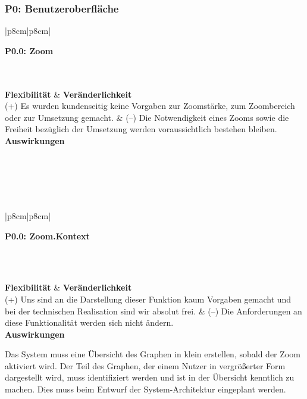 \documentclass[enabledeprecatedfontcommands,fontsize=11pt,paper=a4,twoside]{scrartcl}
\newcounter{one}
\newcounter{two}[one]
\newcommand{\tone}{0\theone}
\newcommand{\one}{\stepcounter{one}0\theone}
\newcommand{\two}{\stepcounter{two}0\thetwo}
\newcommand\s{\rule{0pt}{4ex}}
\begin{document}
\newpage
\subsubsection*{\hypertarget{dd}{P\one}: Benutzeroberfläche}
\begin{tabular} {|p{8cm}|p{8cm}|}
	\hline
	 {\parbox{16cm}{\textbf{\hypertarget{ee}{P\tone.\two}: Zoom}} }\\ \hline\hline
	\\ \hline
	\textbf{Flexibilität}  & \textbf{Veränderlichkeit} \\
	(+) Es wurden kundenseitig keine Vorgaben zur Zoomstärke, zum Zoombereich oder zur Umsetzung gemacht. &
	(--) Die Notwendigkeit eines Zooms sowie die Freiheit bezüglich der Umsetzung werden voraussichtlich bestehen bleiben. \\ \hline
	 {\textbf{Auswirkungen}} \\
	\\ \hline
\end{tabular}
\\ \\ \\
\begin{tabular} {|p{8cm}|p{8cm}|}
	\hline
	 {\parbox{16cm}{\textbf{\hypertarget{ff}{P\tone.\two}: Zoom.Kontext}} }\\ \hline\hline
	 \s\\ [1ex] \hline
	\textbf{Flexibilität}  & \textbf{Veränderlichkeit} \\
	(+) Uns sind an die Darstellung dieser Funktion kaum Vorgaben gemacht und bei der technischen Realisation sind wir absolut frei. &
	(--) Die Anforderungen an diese Funktionalität werden sich nicht ändern. \\ \hline
	 {\textbf{Auswirkungen}} \\
	 {\parbox{16cm}{Das System muss eine Übersicht des Graphen in klein erstellen, sobald der Zoom aktiviert wird. Der Teil des Graphen, der einem Nutzer in vergrößerter Form dargestellt wird, muss identifiziert werden und ist in der Übersicht kenntlich zu machen. Dies muss beim Entwurf der System-Architektur eingeplant werden.} }\\ \hline
\end{tabular}
\end{document}

